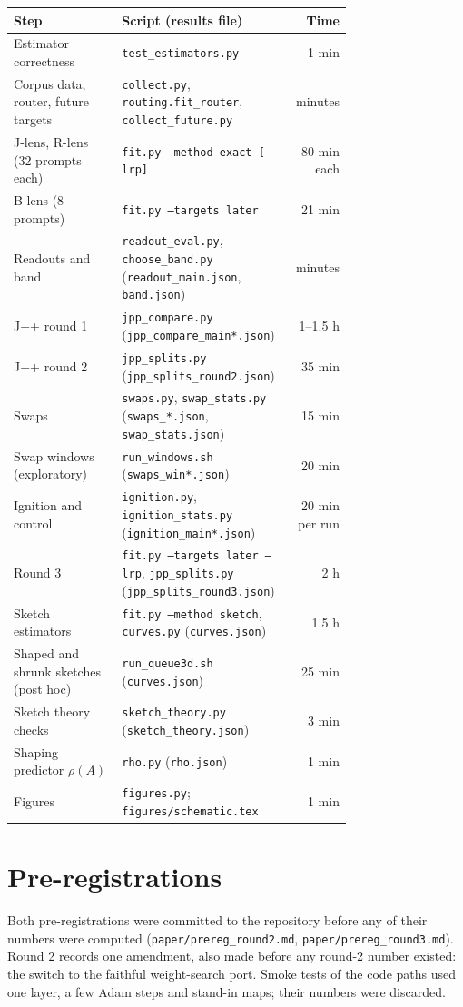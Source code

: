 \documentclass[11pt]{article}
\theoremstyle{definition}
\begin{document}
\begin{center}
\small
\begin{tabular}{p{0.32\linewidth}p{0.42\linewidth}r}
\toprule
Step & Script (results file) & Time \\
\midrule
Estimator correctness & \texttt{test\_estimators.py} & 1 min \\
Corpus data, router, future targets & \texttt{collect.py}, \texttt{routing.fit\_router}, \texttt{collect\_future.py} & minutes \\
J-lens, R-lens (32 prompts each) & \texttt{fit.py --method exact [--lrp]} & 80 min each \\
B-lens (8 prompts) & \texttt{fit.py --targets later} & 21 min \\
Readouts and band & \texttt{readout\_eval.py}, \texttt{choose\_band.py} (\texttt{readout\_main.json}, \texttt{band.json}) & minutes \\
J++ round 1 & \texttt{jpp\_compare.py} (\texttt{jpp\_compare\_main*.json}) & 1--1.5 h \\
J++ round 2 & \texttt{jpp\_splits.py} (\texttt{jpp\_splits\_round2.json}) & 35 min \\
Swaps & \texttt{swaps.py}, \texttt{swap\_stats.py} (\texttt{swaps\_*.json}, \texttt{swap\_stats.json}) & 15 min \\
Swap windows (exploratory) & \texttt{run\_windows.sh} (\texttt{swaps\_win*.json}) & 20 min \\
Ignition and control & \texttt{ignition.py}, \texttt{ignition\_stats.py} (\texttt{ignition\_main*.json}) & 20 min per run \\
Round 3 & \texttt{fit.py --targets later --lrp}, \texttt{jpp\_splits.py} (\texttt{jpp\_splits\_round3.json}) & 2 h \\
Sketch estimators & \texttt{fit.py --method sketch}, \texttt{curves.py} (\texttt{curves.json}) & 1.5 h \\
Shaped and shrunk sketches (post hoc) & \texttt{run\_queue3d.sh} (\texttt{curves.json}) & 25 min \\
Sketch theory checks & \texttt{sketch\_theory.py} (\texttt{sketch\_theory.json}) & 3 min \\
Shaping predictor $\rho(A)$ & \texttt{rho.py} (\texttt{rho.json}) & 1 min \\
Figures & \texttt{figures.py}; \texttt{figures/schematic.tex} & 1 min \\
\bottomrule
\end{tabular}
\end{center}

\section{Pre-registrations}
\label{app:prereg}

Both pre-registrations were committed to the repository before any of their numbers were computed
(\texttt{paper/prereg\_round2.md}, \texttt{paper/prereg\_round3.md}). Round 2 records one amendment,
also made before any round-2 number existed: the switch to the faithful weight-search port. Smoke
tests of the code paths used one layer, a few Adam steps and stand-in maps; their numbers were
discarded.
\end{document}
